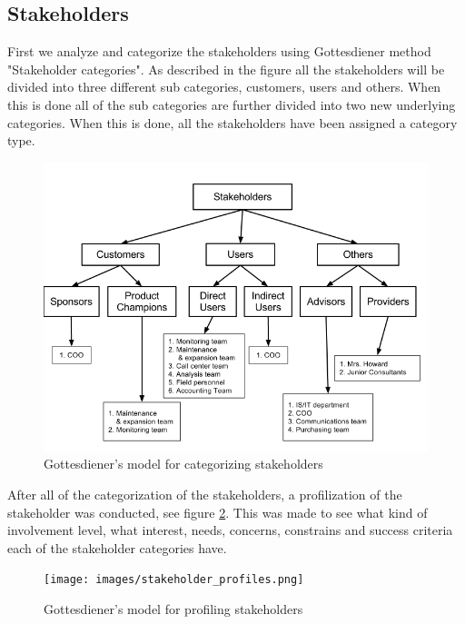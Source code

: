\documentclass[a4paper]{article}
\begin{document}
\subsection{Stakeholders}
\label{sub:stakeholders}
First we analyze and categorize the stakeholders using Gottesdiener method "Stakeholder categories". As described in the figure all the stakeholders will be divided into three different sub categories, customers, users and others. When this is done all of the sub categories are further divided into two new underlying categories. When this is done, all the stakeholders have been assigned a category type. 

\begin{figure}[H]
	\includegraphics[width=1\textwidth]{images/stakeholder_categorization.png}
	\caption{Gottesdiener's model for categorizing stakeholders \cite{gott3}}
	\label{figure:stakeholder_categorization}                      	
\end{figure}

After all of the categorization of the stakeholders, a profilization of the stakeholder was conducted, see figure \ref{figure:stakeholder_profiles}. This was made to see what kind of involvement level, what interest, needs, concerns, constrains and success criteria each of the stakeholder categories have.

\begin{figure}[H]
	\texttt{[image: images/stakeholder\_profiles.png]}
	\caption{Gottesdiener's model for profiling stakeholders \cite{gott3}}
	\label{figure:stakeholder_profiles}
\end{figure}
\end{document}
